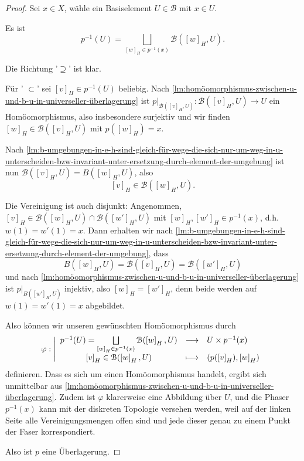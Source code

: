 \begin{proof}
    Sei $x\in X$, wähle ein Basiselement  $U\in \mathcal{B}$ mit $x\in U$.
    \begin{claim}
        Es ist
        \[
            p^{-1} (U) = \bigsqcup_{[w]_H \in p^{-1} (x)} \mathcal{B}([w]_H, U)
        .\] 
    \end{claim}
    \begin{subproof}
        Die Richtung '$\supseteq$' ist klar.

        Für ' $\subset $' sei $[v]_H \in p^{-1} (U)$ beliebig. Nach \autoref{lm:homöomorphismus-zwischen-u-und-b-u-in-universeller-überlagerung} ist $p|_{\mathcal{B}([v]_H, U)}\colon  \mathcal{B}([v]_H, U) \to  U$ ein Homöomorphismus, also insbesondere surjektiv und wir finden $[w]_H \in \mathcal{B}([v]_H, U)$ mit $p([w]_H) = x$.

        Nach \autoref{lm:b-umgebungen-in-e-h-sind-gleich-für-wege-die-sich-nur-um-weg-in-u-unterscheiden-bzw-invariant-unter-ersetzung-durch-element-der-umgebung} ist nun  $\mathcal{B}([v]_H, U) = B([w]_H, U)$, also 
        \[
            [v]_H \in \mathcal{B}([w]_H, U)
        .\] 

        Die Vereinigung ist auch disjunkt: Angenommen, $[v]_H \in \mathcal{B}([w]_H, U)\cap \mathcal{B}([w']_H, U)$ mit $[w]_H, [w']_H \in p^{-1} (x)$, d.h. $w(1) = w'(1) = x$. Dann erhalten wir nach \autoref{lm:b-umgebungen-in-e-h-sind-gleich-für-wege-die-sich-nur-um-weg-in-u-unterscheiden-bzw-invariant-unter-ersetzung-durch-element-der-umgebung}, dass  
        \[
            B([w]_H,U) = \mathcal{B}([v]_H, U) = \mathcal{B}([w']_H, U)
        \]
        und nach \autoref{lm:homöomorphismus-zwischen-u-und-b-u-in-universeller-überlagerung} ist $p|_{B([w']_H, U)}$ injektiv, also $[w]_H = [w']_H$, denn beide werden auf $w(1) = w'(1) = x$ abgebildet.
    \end{subproof}
    Also können wir unseren gewünschten Homöomorphismus durch
        \begin{equation*}
        \varphi : \left| \begin{array}{c c l} 
            p^{-1} (U) = \bigsqcup\limits_{\left[w\right]_H \in p^{-1} (x)}\mathcal{B}(\left[w\right]_H, U) & \longrightarrow & U\times p^{-1} (x) \\
            \left[v\right]_H \in \mathcal{B}(\left[w\right]_H,U) & \longmapsto &  (p(\left[v\right]_H), \left[w\right]_H)
        \end{array} \right.
    \end{equation*}
    definieren. Dass es sich um einen Homöomorphismus handelt, ergibt sich unmittelbar aus \autoref{lm:homöomorphismus-zwischen-u-und-b-u-in-universeller-überlagerung}. Zudem ist $\varphi $ klarerweise eine Abbildung über $U$, und die Phaser  $p^{-1} (x)$ kann mit der diskreten Topologie versehen werden, weil auf der linken Seite alle Vereinigungsmengen offen sind und jede dieser genau zu einem Punkt der Faser korrespondiert.

    Also ist $p$ eine Überlagerung.
\end{proof}

